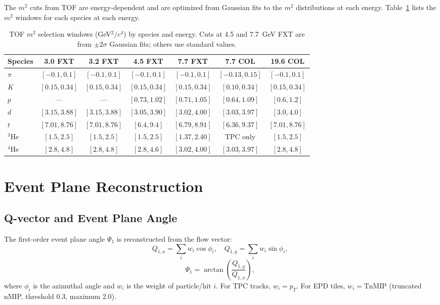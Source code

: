 \documentclass[aps,prc,preprint,superscriptaddress,nofootinbib]{revtex4-2}
\begin{document}
The $m^2$ cuts from TOF are energy-dependent and are optimized from Gaussian fits to the $m^2$ distributions at each energy. Table~\ref{tab:m2_cuts} lists the $m^2$ windows for each species at each energy.

\begin{table}[ht]
\centering
\caption{TOF $m^2$ selection windows (GeV$^2/c^4$) by species and energy. Cuts at 4.5 and 7.7~GeV FXT are from $\pm 2\sigma$ Gaussian fits; others use standard values.}
\label{tab:m2_cuts}
\begin{tabular}{lcccccc}
\toprule
Species & 3.0 FXT & 3.2 FXT & 4.5 FXT & 7.7 FXT & 7.7 COL & 19.6 COL \\
\midrule
$\pi$ & $[-0.1, 0.1]$ & $[-0.1, 0.1]$ & $[-0.1, 0.1]$ & $[-0.1, 0.1]$ & $[-0.13, 0.15]$ & $[-0.1, 0.1]$ \\
$K$   & $[0.15, 0.34]$ & $[0.15, 0.34]$ & $[0.15, 0.34]$ & $[0.15, 0.34]$ & $[0.10, 0.34]$ & $[0.15, 0.34]$ \\
$p$   & --- & --- & $[0.73, 1.02]$ & $[0.71, 1.05]$ & $[0.64, 1.09]$ & $[0.6, 1.2]$ \\
$d$   & $[3.15, 3.88]$ & $[3.15, 3.88]$ & $[3.05, 3.90]$ & $[3.02, 4.00]$ & $[3.03, 3.97]$ & $[3.0, 4.0]$ \\
$t$   & $[7.01, 8.76]$ & $[7.01, 8.76]$ & $[6.4, 9.4]$   & $[6.79, 8.91]$ & $[6.36, 9.37]$ & $[7.01, 8.76]$ \\
$^3$He & $[1.5, 2.5]$  & $[1.5, 2.5]$   & $[1.5, 2.5]$   & $[1.37, 2.40]$ & TPC only       & $[1.5, 2.5]$ \\
$^4$He & $[2.8, 4.8]$  & $[2.8, 4.8]$   & $[2.8, 4.6]$   & $[3.02, 4.00]$ & $[3.03, 3.97]$ & $[2.8, 4.8]$ \\
\bottomrule
\end{tabular}
\end{table}

\section{Event Plane Reconstruction}
\label{sec:event_plane}

\subsection{Q-vector and Event Plane Angle}
\label{subsec:qvector}

The first-order event plane angle $\Psi_1$ is reconstructed from the flow vector:
\begin{equation}
    Q_{1,x} = \sum_i w_i \cos\phi_i, \quad Q_{1,y} = \sum_i w_i \sin\phi_i,
\end{equation}
\begin{equation}
    \Psi_1 = \arctan\left(\frac{Q_{1,y}}{Q_{1,x}}\right),
\end{equation}
where $\phi_i$ is the azimuthal angle and $w_i$ is the weight of particle/hit $i$. For TPC tracks, $w_i = p_T$. For EPD tiles, $w_i = \text{TnMIP}$ (truncated nMIP, threshold 0.3, maximum 2.0).
\end{document}
